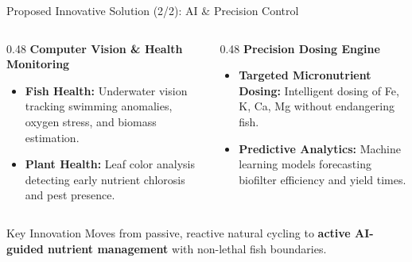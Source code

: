 \documentclass[aspectratio=169, 10pt]{beamer}
\begin{document}
\begin{frame}{Proposed Innovative Solution (2/2): AI \& Precision Control}
  \begin{columns}[T]
    \begin{column}{0.48\textwidth}
      \textbf{Computer Vision \& Health Monitoring}
      \begin{itemize}
        \item \textbf{Fish Health:} Underwater vision tracking swimming anomalies, oxygen stress, and biomass estimation.
        \item \textbf{Plant Health:} Leaf color analysis detecting early nutrient chlorosis and pest presence.
      \end{itemize}
    \end{column}
    
    \begin{column}{0.48\textwidth}
      \textbf{Precision Dosing Engine}
      \begin{itemize}
        \item \textbf{Targeted Micronutrient Dosing:} Intelligent dosing of Fe, K, Ca, Mg without endangering fish.
        \item \textbf{Predictive Analytics:} Machine learning models forecasting biofilter efficiency and yield times.
      \end{itemize}
    \end{column}
  \end{columns}

  \vspace{0.5cm}
  \begin{alertblock}{Key Innovation}
    Moves from passive, reactive natural cycling to \textbf{active AI-guided nutrient management} with non-lethal fish boundaries.
  \end{alertblock}
\end{frame}
\end{document}
